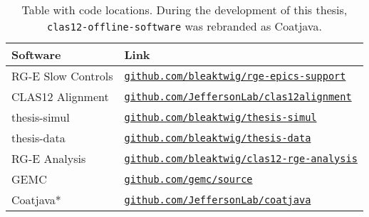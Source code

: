     \begin{table}[b!]
        \begin{center}
            \begin{tabularx}{0.90\textwidth}{ll}
                \toprule
                \textbf{Software}  & \textbf{Link} \\
                \midrule \midrule
                RG-E Slow Controls &
                    \href{https://github.com/bleaktwig/rge-epics-support}
                    {\texttt{github.com/bleaktwig/rge-epics-support}} \\
                \midrule
                CLAS12 Alignment   &
                    \href{https://github.com/JeffersonLab/clas12alignment}
                    {\texttt{github.com/JeffersonLab/clas12alignment}} \\
                \midrule
                thesis-simul       &
                    \href{https://github.com/bleaktwig/thesis-simul}
                    {\texttt{github.com/bleaktwig/thesis-simul}} \\
                thesis-data        &
                    \href{https://github.com/bleaktwig/thesis-data}
                    {\texttt{github.com/bleaktwig/thesis-data}} \\
                RG-E Analysis      &
                    \href{https://github.com/bleaktwig/clas12-rge-analysis}
                    {\texttt{github.com/bleaktwig/clas12-rge-analysis}} \\
                GEMC               &
                    \href{https://github.com/gemc/source}
                    {\texttt{github.com/gemc/source}} \\
                Coatjava*          &
                    \href{https://github.com/JeffersonLab/coatjava}
                    {\texttt{github.com/JeffersonLab/coatjava}} \\
                \bottomrule
            \end{tabularx}
        \end{center}

        \caption{Table with code locations.
        During the development of this thesis, \texttt{clas12-offline-software} was rebranded as Coatjava.}
        \label{tab::20.02::code_locations}
    \end{table}
